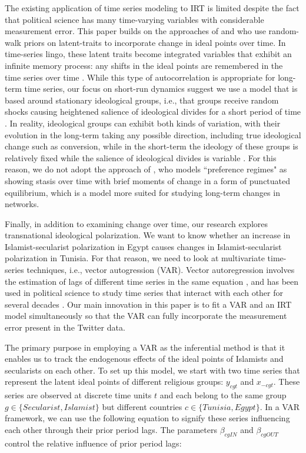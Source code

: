 \documentclass[12pt]{article}
\begin{document}
The existing application of time series modeling to IRT is limited despite the fact that political science has many time-varying variables with considerable measurement error. This paper builds on the approaches of \textcite{quinn2002} and \textcite{kropko2013} who use random-walk priors on latent-traits to incorporate change in ideal points over time. In time-series lingo, these latent traits become integrated variables that exhibit an infinite memory process: any shifts in the ideal points are remembered in the time series over time \parencite[Ch. 5]{timeseries2014}. While this type of autocorrelation is appropriate for long-term time series, our focus on short-run dynamics suggest we use a model that is based around stationary ideological groups, i.e., that groups receive random shocks causing heightened salience of ideological divides for a short period of time \parencite[Ch. 2]{timeseries2014}. In reality, ideological groups can exhibit both kinds of variation, with their evolution in the long-term taking any possible direction, including true ideological change such as conversion, while in the short-term the ideology of these groups is relatively fixed while the salience of ideological divides is variable \parencite{owen2010clash}. For this reason, we do not adopt the approach of \textcite{park2011}, who models ``preference regimes" as showing stasis over time with brief moments of change in a form of punctuated equilibrium, which is a model more suited for studying long-term changes in networks.

Finally, in addition to examining change over time, our research explores transnational ideological polarization. We want to know whether an increase in Islamist-secularist polarization in Egypt causes changes in Islamist-secularist polarization in Tunisia. For that reason, we need to look at multivariate time-series techniques, i.e., vector autogression (VAR). Vector autoregression involves the estimation of lags of different time series in the same equation \parencite{sims1980}, and has been used in political science to study time series that interact with each other for several decades \parencite{freeman1989}. Our main innovation in this paper is to fit a VAR and an IRT model simultaneously so that the VAR can fully incorporate the measurement error present in the Twitter data.

The primary purpose in employing a VAR as the inferential method is that it enables us to track the endogenous effects of the ideal points of Islamists and secularists on each other. To set up this model, we start with two time series that represent the latent ideal points of different religious groups: $y_{cgt}$ and $x_{-cgt}$. These series are observed at discrete time units $t$ and each belong to the same group $g \in \{Secularist, Islamist\}$ but different countries $c \in \{Tunisia, Egypt\}$. In a VAR framework, we can use the following equation to signify these series influencing each other through their prior period lags. The parameters $\beta_{cgIN}$ and $\beta_{cgOUT}$ control the relative influence of prior period lags:
\end{document}
